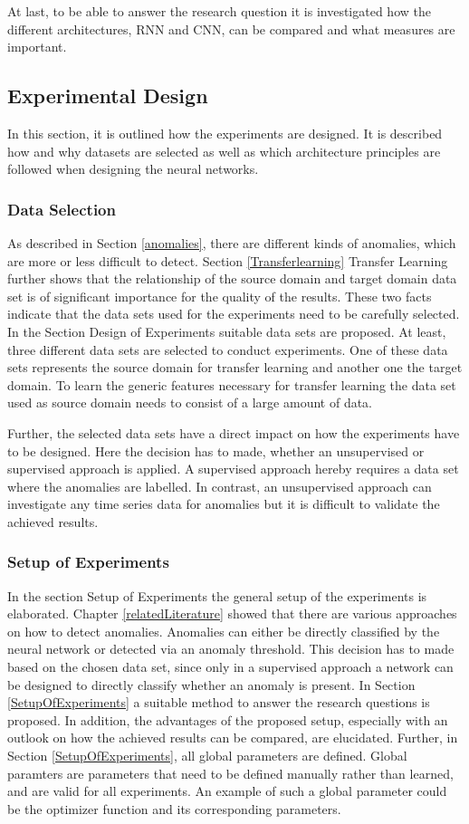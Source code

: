 At last, to be able to answer the research question it is investigated how the different architectures, RNN and CNN, can be compared and what measures are important. 

\subsection{Experimental Design}
In this section, it is outlined how the experiments are designed. It is described how and why datasets are selected as well as which architecture principles are followed when designing the neural networks.

\subsubsection{Data Selection}
As described in Section \ref{anomalies}, there are different kinds of anomalies, which are more or less difficult to detect. Section \ref{Transferlearning} Transfer Learning further shows that the relationship of the source domain and target domain data set is of significant importance for the quality of the results. These two facts indicate that the data sets used for the experiments need to be carefully selected. In the Section Design of Experiments suitable data sets are proposed. At least, three different data sets are selected to conduct experiments. One of these data sets represents the source domain for transfer learning and another one the target domain. To learn the generic features necessary for transfer learning the data set used as source domain needs to consist of a large amount of data.

Further, the selected data sets have a direct impact on how the experiments have to be designed. Here the decision has to made, whether an unsupervised or supervised approach is applied. A supervised approach hereby requires a data set where the anomalies are labelled. In contrast, an unsupervised approach can investigate any time series data for anomalies but it is difficult to validate the achieved results. 

\subsubsection{Setup of Experiments}
In the section Setup of Experiments the general setup of the experiments is elaborated. Chapter \ref{relatedLiterature} showed that there are various approaches on how to detect anomalies. Anomalies can either be directly classified by the neural network or detected via an anomaly threshold. This decision has to made based on the chosen data set, since only in a supervised approach a network can be designed to directly classify whether an anomaly is present. In Section \ref{SetupOfExperiments} a suitable method to answer the research questions is proposed. In addition, the advantages of the proposed setup, especially with an outlook on how the achieved results can be compared, are elucidated.   
Further, in Section \ref{SetupOfExperiments}, all global parameters are defined. Global paramters are parameters that need to be defined manually rather than learned, and are valid for all experiments. An example of such a global parameter could be the optimizer function and its corresponding parameters.


